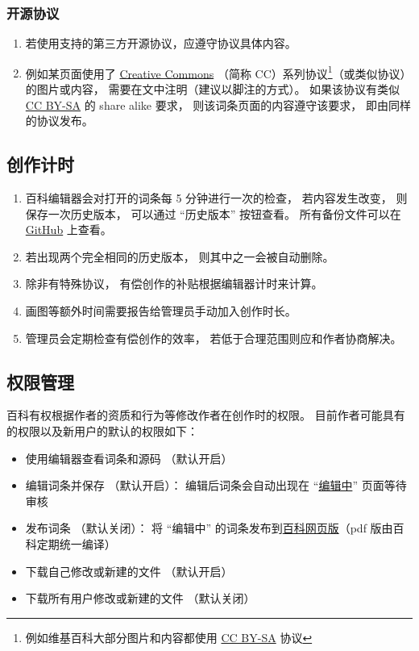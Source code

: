 \subsubsection{开源协议}
\begin{enumerate}
\item 若使用支持的第三方开源协议，应遵守协议具体内容。
\item 例如某页面使用了 \href{https://creativecommons.org/licenses/}{Creative Commons} （简称 CC）系列协议\footnote{例如维基百科大部分图片和内容都使用 \href{https://creativecommons.org/licenses/by-sa/3.0/}{CC BY-SA} 协议}（或类似协议）的图片或内容， 需要在文中注明（建议以脚注的方式）。 如果该协议有类似 \href{https://creativecommons.org/licenses/by-sa/3.0/}{CC BY-SA} 的 share alike 要求， 则该词条页面的内容遵守该要求， 即由同样的协议发布。
\end{enumerate}

\subsection{创作计时}
\begin{enumerate}
\item 百科编辑器会对打开的词条每 5 分钟进行一次的检查， 若内容发生改变， 则保存一次历史版本， 可以通过 “历史版本” 按钮查看。 所有备份文件可以在 \href{https://github.com/MacroUniverse/PhysWiki-backup}{GitHub} 上查看。
\item 若出现两个完全相同的历史版本， 则其中之一会被自动删除。
\item 除非有特殊协议， 有偿创作的补贴根据编辑器计时来计算。
\item 画图等额外时间需要报告给管理员手动加入创作时长。
\item 管理员会定期检查有偿创作的效率， 若低于合理范围则应和作者协商解决。
\end{enumerate}

\subsection{权限管理}
百科有权根据作者的资质和行为等修改作者在创作时的权限。 目前作者可能具有的权限以及新用户的默认的权限如下：
\begin{itemize}
\item 使用编辑器查看词条和源码 （默认开启）
\item 编辑词条并保存 （默认开启）： 编辑后词条会自动出现在 “\href{https://wuli.wiki/changed}{编辑中}” 页面等待审核
\item 发布词条 （默认关闭）： 将 “编辑中” 的词条发布到\href{https://wuli.wiki/online}{百科网页版}（pdf 版由百科定期统一编译）
\item 下载自己修改或新建的文件 （默认开启）
\item 下载所有用户修改或新建的文件 （默认关闭）
\end{itemize}
